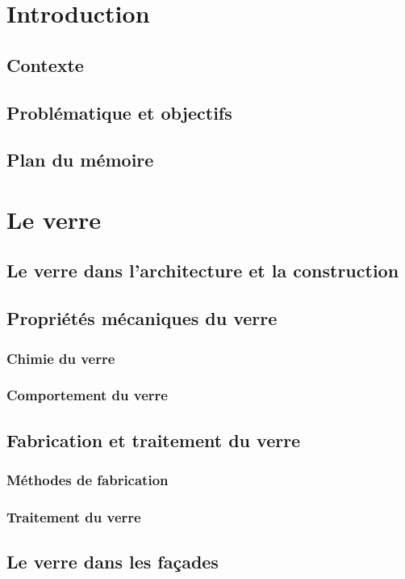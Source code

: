 \documentclass[11pt,titlepage]{article}
\begin{document}
\printglossary[type=\acronymtype,title=Liste des abréviations]
\newpage
\section{Introduction}

\subsection{Contexte}

\subsection{Problématique et objectifs}
\subsection{Plan du mémoire}
\newpage
\section{Le verre}
\subsection{Le verre dans l'architecture et la construction}
\subsection{Propriétés mécaniques du verre}
\subsubsection{Chimie du verre}
\subsubsection{Comportement du verre}
\subsection{Fabrication et traitement du verre}
\subsubsection{Méthodes de fabrication}
\subsubsection{Traitement du verre}
\subsection{Le verre dans les façades}
\end{document}
